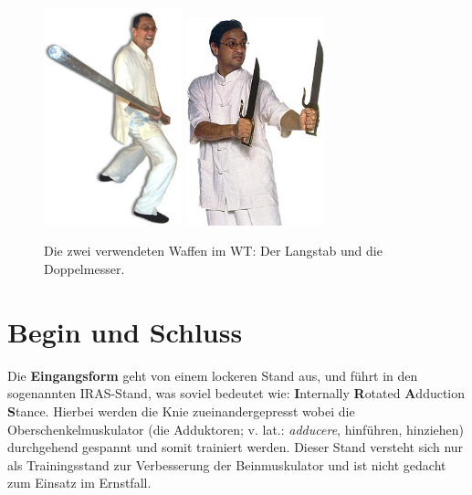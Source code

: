 \begin{figure}[htbp]
	\centering
	\includegraphics[width=4cm]{resources/images/misc/langstab_leungting}
	\hspace{3cm}
	\includegraphics[width=4cm]{resources/images/misc/doppelmesser_leungting}
	\caption{Die zwei verwendeten Waffen im WT: Der Langstab und die Doppelmesser.}
\end{figure}

\newpage


\section*{Begin und Schluss}

Die \textbf{Eingangsform} geht von einem lockeren Stand aus, und f\"uhrt in den sogenannten IRAS-Stand, was soviel bedeutet wie: \textbf{I}nternally \textbf{R}otated \textbf{A}dduction \textbf{S}tance. Hierbei werden die Knie zueinandergepresst wobei die Oberschenkelmuskulator (die Adduktoren; v. lat.: \textit{adducere}, hinf\"uhren, hinziehen) durchgehend gespannt und somit trainiert werden. Dieser Stand versteht sich nur als Trainingsstand zur Verbesserung der Beinmuskulator und ist nicht gedacht zum Einsatz im Ernstfall.

